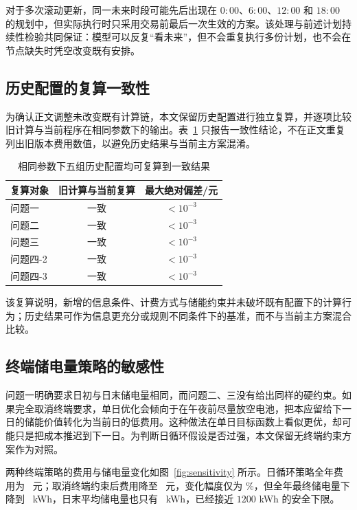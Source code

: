 对于多次滚动更新，同一未来时段可能先后出现在 $0{:}00$、$6{:}00$、$12{:}00$ 和 $18{:}00$ 的规划中，但实际执行时只采用交易前最后一次生效的方案。该处理与前述计划持续性检验共同保证：模型可以反复“看未来”，但不会重复执行多份计划，也不会在节点缺失时凭空改变既有安排。

\subsection{历史配置的复算一致性}

为确认正文调整未改变既有计算链，本文保留历史配置进行独立复算，并逐项比较旧计算与当前程序在相同参数下的输出。表~\ref{tab:historical-regression} 只报告一致性结论，不在正文重复列出旧版本费用数值，以避免历史结果与当前主方案混淆。

\begin{table}[htbp]
    \caption{相同参数下五组历史配置均可复算到一致结果}
    \label{tab:historical-regression}
    \centering
    \begin{tabular}{l c c}
        \toprule
        复算对象 & 旧计算与当前复算 & 最大绝对偏差/元 \\
        \midrule
        问题一 & 一致 & $<10^{-3}$ \\
        问题二 & 一致 & $<10^{-3}$ \\
        问题三 & 一致 & $<10^{-3}$ \\
        问题四-2 & 一致 & $<10^{-3}$ \\
        问题四-3 & 一致 & $<10^{-3}$ \\
        \bottomrule
    \end{tabular}
\end{table}

该复算说明，新增的信息条件、计费方式与储能约束并未破坏既有配置下的计算行为；历史结果可作为信息更充分或规则不同条件下的基准，而不与当前主方案混合比较。

\subsection{终端储电量策略的敏感性}
\label{sec:terminal}

问题一明确要求日初与日末储电量相同，而问题二、三没有给出同样的硬约束。如果完全取消终端要求，单日优化会倾向于在午夜前尽量放空电池，把本应留给下一日的储能价值转化为当前日的低费用。这种做法在单日目标函数上看似更优，却可能只是把成本推迟到下一日。为判断日循环假设是否过强，本文保留无终端约束方案作为对照。

两种终端策略的费用与储电量变化如图~\ref{fig:sensitivity} 所示。日循环策略全年费用为 \SensTerminalCycle\ 元；取消终端约束后费用降至 \SensTerminalFree\ 元，变化幅度仅为 \SensTerminalPct\%，但全年最终储电量下降到 \SensTerminalFreeSoc\ kWh，日末平均储电量也只有 \SensTerminalFreeMean\ kWh，已经接近 $1200$ kWh 的安全下限。

